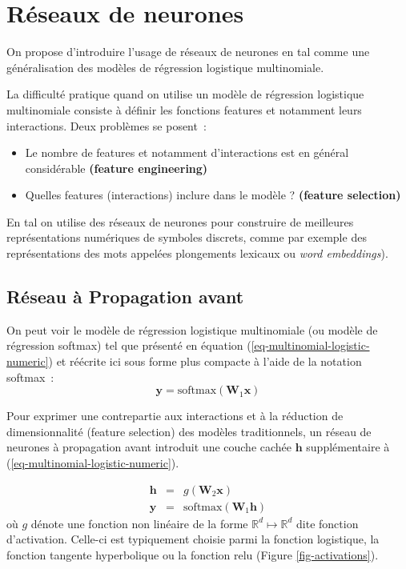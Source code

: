 \documentclass[11pt,openany]{book}
\newcommand{\ac}[1]{{\sc #1}} %
\begin{document}
\section{Réseaux de neurones}

On propose d'introduire l'usage de réseaux de neurones en \ac{tal}
comme une généralisation des modèles de régression logistique multinomiale.

La difficulté pratique quand on utilise un modèle
de régression logistique multinomiale consiste à définir les
fonctions features et notamment leurs interactions. Deux problèmes se
posent~:
\begin{itemize}
\item Le nombre de features et notamment d'interactions est en général
  considérable {\bf (feature engineering)}
\item Quelles features (interactions) inclure dans le modèle ? {\bf
    (feature selection)}
\end{itemize}

En \ac{tal} on utilise des réseaux de neurones pour construire de
meilleures représentations numériques de symboles discrets, comme par
exemple des représentations des mots appelées plongements lexicaux ou {\em word embeddings}).

\subsection{Réseau à Propagation avant}

On peut voir le modèle de régression logistique multinomiale (ou
modèle de régression softmax) tel que présenté en équation
(\ref{eq-multinomial-logistic-numeric}) et réécrite ici sous forme
plus compacte à l'aide de la notation softmax~:
\begin{equation}
\mathbf{y} = \text{softmax}(\mathbf{W}_1 \mathbf{x})
\end{equation}

Pour exprimer une contrepartie aux interactions et à la réduction de
dimensionnalité (feature selection) des modèles traditionnels, un
réseau de neurones à propagation avant introduit une couche cachée $\mathbf{h}$
supplémentaire à (\ref{eq-multinomial-logistic-numeric}).

\begin{eqnarray} 
\mathbf{h} &=& g(\mathbf{W}_2\mathbf{x})\\
\mathbf{y} &=& \text{softmax}(\mathbf{W}_1 \mathbf{h})
\end{eqnarray}
où $g$ dénote une fonction non linéaire de la forme $\mathbb{R}^d \mapsto
\mathbb{R}^d$ dite fonction d'activation. Celle-ci est typiquement
choisie parmi la fonction logistique, la fonction tangente
hyperbolique ou la fonction relu (Figure \ref{fig-activations}).
\end{document}
